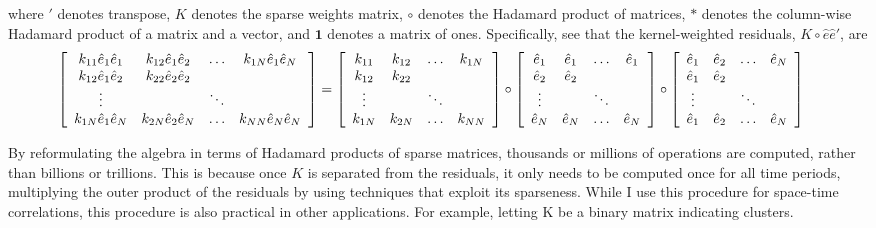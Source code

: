 where $'$ denotes transpose, $K$ denotes the sparse weights matrix, $\circ$ denotes the Hadamard product of matrices, $*$ denotes the column-wise Hadamard product of a matrix and a vector, and $\mathbf{1}$ denotes a matrix of ones. Specifically, see that the kernel-weighted residuals, $K \circ \hat{e} \hat{e}'$, are 
\begin{eqnarray*}
\hspace*{-1em}
\left[\begin{array}{cccc}
k_{11}\hat{e}_{1}\hat{e}_{1} & k_{12}\hat{e}_{1}\hat{e}_{2} & \hdots & k_{1N}\hat{e}_{1}\hat{e}_{N}  \\
k_{12}\hat{e}_{1}\hat{e}_{2} & k_{22}\hat{e}_{2}\hat{e}_{2} &	     & 		     					\\
\vdots						 &   				  			& \ddots &  	        					\\
k_{1N}\hat{e}_{1}\hat{e}_{N} & k_{2N}\hat{e}_{2}\hat{e}_{N} & \hdots & k_{NN}\hat{e}_{N}\hat{e}_{N}
\end{array}\right] 
=
\left[\begin{array}{cccc}
k_{11} & k_{12} & \hdots  & k_{1N}  \\
k_{12} & k_{22} & 	      & 		\\
\vdots	&   	& \ddots  &	 	\\
k_{1N} & k_{2N} & \hdots  & k_{NN}
\end{array}\right]
\circ
\left[\begin{array}{cccc}
\hat{e}_{1} & \hat{e}_{1} & \hdots  & \hat{e}_{1}  \\
\hat{e}_{2} & \hat{e}_{2} & 	    & 		       \\
\vdots		&   		  & \ddots  &  	           \\
\hat{e}_{N} & \hat{e}_{N} & \hdots  & \hat{e}_{N}
\end{array}\right]
\circ
\left[\begin{array}{cccc}
\hat{e}_{1} & \hat{e}_{2} & \hdots  & \hat{e}_{N} \\
\hat{e}_{1} & \hat{e}_{2} & 	    &			  \\
\vdots      &			  & \ddots  &			  \\
\hat{e}_{1} & \hat{e}_{2} & \hdots  & \hat{e}_{N}
\end{array}\right]
\end{eqnarray*}


By reformulating the algebra in terms of Hadamard products of sparse matrices, thousands or millions of operations are computed, rather than billions or trillions. This is because once $K$ is separated from the residuals, it only needs to be computed once for all time periods, multiplying the outer product of the residuals by using techniques that exploit its sparseness. While I use this procedure for space-time correlations, this procedure is also practical in other applications. For example, letting K be a binary matrix indicating clusters.


